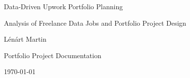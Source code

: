 
\begin{titlepage}
    \centering

    \vspace*{2cm}

    {\Large 
    Data-Driven Upwork Portfolio Planning
    \par}

    \vspace{0.8cm}

    {\large
    Analysis of Freelance Data Jobs and Portfolio Project Design
    \par}

    \vfill

    {\large
    Lénárt Martin
    \par}

    \vspace{0.4cm}

    {\normalsize
    Portfolio Project Documentation
    \par}

    \vfill

    {\normalsize
    \today
    \par}

\end{titlepage}